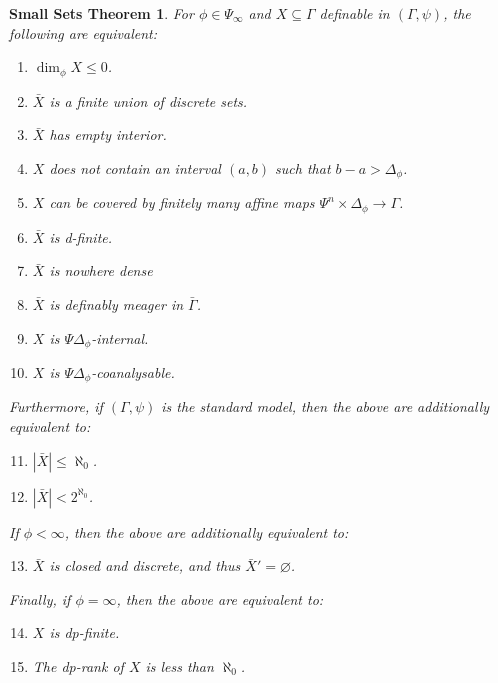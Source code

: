 \documentclass[11pt]{amsart}
\theoremstyle{plain}
\newtheorem{smallSetsTheorem}[thm]{Small Sets Theorem}
\theoremstyle{definition}
\numberwithin{equation}{section}
\newcommand\0{\varnothing}
\begin{document}
\begin{smallSetsTheorem}\label{smallSetsTheorem_label}
For $\phi\in\Psi_{\infty}$ and $X\subseteq\Gamma$ definable in $(\Gamma,\psi)$, the following are equivalent:
\begin{enumerate}
\item\label{smallequiv1} $\dim_{\phi} X\leq 0$.
\item\label{smallequiv2} $\bar{X}$ is a finite union of discrete sets.
\item\label{smallequiv3} $\bar{X}$ has empty interior.
\item\label{smallequiv4} $X$ does not contain an interval $(a,b)$ such that $b-a>\Delta_{\phi}$.
\item\label{smallequiv5} $X$ can be covered by finitely many affine maps $\Psi^n\times\Delta_{\phi}\to\Gamma$.
\item\label{smallequiv6} $\bar{X}$ is d-finite.
\item\label{smallequiv7} $\bar{X}$ is nowhere dense \item\label{smallequiv8} $\bar{X}$ is definably meager in $\bar{\Gamma}$.
\item\label{smallequiv9} $X$ is $\Psi\Delta_{\phi}$-internal.
\item\label{smallequiv10} $X$ is $\Psi\Delta_{\phi}$-coanalysable.
\end{enumerate}
Furthermore, if $(\Gamma,\psi)$ is the standard model, then the above are additionally equivalent to:
\begin{enumerate}
\setcounter{enumi}{10}
\item\label{smallequiv11} $|\bar{X}|\leq\aleph_0$.
\item\label{smallequiv12} $|\bar{X}|<2^{\aleph_0}$.
\end{enumerate}
If $\phi<\infty$, then the above are additionally equivalent to:
\begin{enumerate}\setcounter{enumi}{12}
\item\label{smallequiv13} $\bar{X}$ is closed and discrete, and thus $\bar{X}'=\varnothing$.
\end{enumerate}
Finally, if $\phi=\infty$, then the above are equivalent to:
\begin{enumerate}\setcounter{enumi}{13}
\item\label{smallequiv14} $X$ is dp-finite.
\item\label{smallequiv15} The dp-rank of $X$ is less than $\aleph_0$.
\end{enumerate}
\end{smallSetsTheorem}
\end{document}
